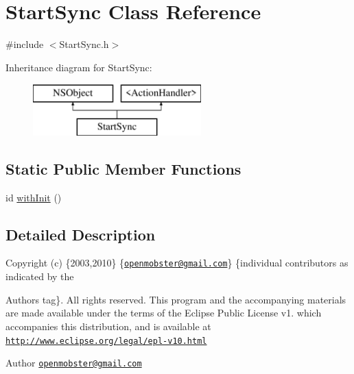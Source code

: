 \hypertarget{interface_start_sync}{
\section{\-Start\-Sync \-Class \-Reference}
\label{interface_start_sync}
}


{\ttfamily \#include $<$\-Start\-Sync.\-h$>$}

\-Inheritance diagram for \-Start\-Sync\-:\begin{figure}[H]
\begin{center}
\leavevmode
\includegraphics[height=2.000000cm]{interface_start_sync}
\end{center}
\end{figure}
\subsection*{\-Static \-Public \-Member \-Functions}
\begin{DoxyCompactItemize}
\item 
id \hyperlink{interface_start_sync_af805d5288b7622ed16a8369f8c0301da}{with\-Init} ()
\end{DoxyCompactItemize}


\subsection{\-Detailed \-Description}
\-Copyright (c) \{2003,2010\} \{\href{mailto:openmobster@gmail.com}{\tt openmobster@gmail.\-com}\} \{individual contributors as indicated by the \begin{DoxyAuthor}{\-Authors}
tag\}. \-All rights reserved. \-This program and the accompanying materials are made available under the terms of the \-Eclipse \-Public \-License v1. which accompanies this distribution, and is available at \href{http://www.eclipse.org/legal/epl-v10.html}{\tt http\-://www.\-eclipse.\-org/legal/epl-\/v10.\-html}
\end{DoxyAuthor}
\begin{DoxyAuthor}{\-Author}
\href{mailto:openmobster@gmail.com}{\tt openmobster@gmail.\-com} 
\end{DoxyAuthor}


